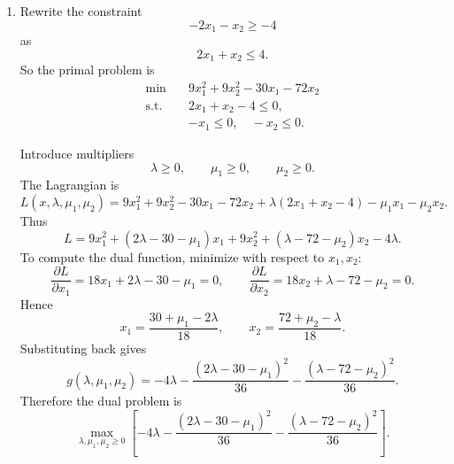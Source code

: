 \documentclass[11pt,letter,notitlepage]{article}
\theoremstyle{definition}
\begin{document}
\begin{solution}
\begin{enumerate}[label=(\alph*)]
Therefore, according to slackness and stationarity, a feasible dual point is
\[
y^*=(0,0,2),\qquad
\alpha^*=(3,0,5,0),\qquad
\beta^*=(0,0,0,3).
\]
Indeed,
\[
c+y_1a_1-y_2a_2-y_3a_3-\alpha+\beta
=
(1,2,3,-1)-2(-1,1,-1,1)-(3,0,5,0)+(0,0,0,3)=0.
\]
The dual value is
\[
d^*
=
-6\cdot 0+2\cdot 0+8\cdot 2+\ell^T\alpha^*-u^T\beta^*
=
16-15=1.
\]
Hence
\[
d^*=p^*=1,
\]
so \(y^*,\alpha^*,\beta^*\) is dual optimal.

Now verify the KKT conditions.

\textbf{Primal feasibility:}
\[
x^*=(0,3,0,5)^T
\]
satisfies all primal constraints.

\textbf{Dual feasibility:}
\[
y^*\ge 0,\qquad \alpha^*\ge 0,\qquad \beta^*\ge 0.
\]

\textbf{Complementary slackness:}
\[
y_1(a_1^Tx^*-6)=0,\qquad y_2(2-a_2^Tx^*)=0,\qquad y_3(8-a_3^Tx^*)=2(8-8)=0,
\]
and
\[
\alpha_i(\ell_i-x_i^*)=0,\qquad \beta_i(x_i^*-u_i)=0,\qquad i=1,2,3,4.
\]
In particular,
\[
\alpha_1(0-0)=0,\qquad \alpha_3(0-0)=0,\qquad \beta_4(5-5)=0.
\]

\textbf{Stationarity:}
\[
c+y_1a_1-y_2a_2-y_3a_3-\alpha+\beta=0,
\]
which we already checked explicitly above.

Therefore all KKT conditions hold.

\item
Rewrite the constraint
\[
-2x_1-x_2\ge -4
\]
as
\[
2x_1+x_2\le 4.
\]
So the primal problem is
\[
\begin{aligned}
\min\quad & 9x_1^2+9x_2^2-30x_1-72x_2\\
\text{s.t.}\quad & 2x_1+x_2-4\le 0,\\
& -x_1\le 0,\quad -x_2\le 0.
\end{aligned}
\]

Introduce multipliers
\[
\lambda\ge 0,\qquad \mu_1\ge 0,\qquad \mu_2\ge 0.
\]
The Lagrangian is
\[
L(x,\lambda,\mu_1,\mu_2)
=
9x_1^2+9x_2^2-30x_1-72x_2
+\lambda(2x_1+x_2-4)-\mu_1x_1-\mu_2x_2.
\]
Thus
\[
L
=
9x_1^2+(2\lambda-30-\mu_1)x_1
+9x_2^2+(\lambda-72-\mu_2)x_2
-4\lambda.
\]
To compute the dual function, minimize with respect to \(x_1,x_2\):
\[
\frac{\partial L}{\partial x_1}=18x_1+2\lambda-30-\mu_1=0,
\qquad
\frac{\partial L}{\partial x_2}=18x_2+\lambda-72-\mu_2=0.
\]
Hence
\[
x_1=\frac{30+\mu_1-2\lambda}{18},
\qquad
x_2=\frac{72+\mu_2-\lambda}{18}.
\]
Substituting back gives
\[
g(\lambda,\mu_1,\mu_2)
=
-4\lambda
-\frac{(2\lambda-30-\mu_1)^2}{36}
-\frac{(\lambda-72-\mu_2)^2}{36}.
\]
Therefore the dual problem is
\[
\max_{\lambda,\mu_1,\mu_2\ge 0}
\left[
-4\lambda
-\frac{(2\lambda-30-\mu_1)^2}{36}
-\frac{(\lambda-72-\mu_2)^2}{36}
\right].
\]


\end{enumerate}
\end{solution}
\end{document}
